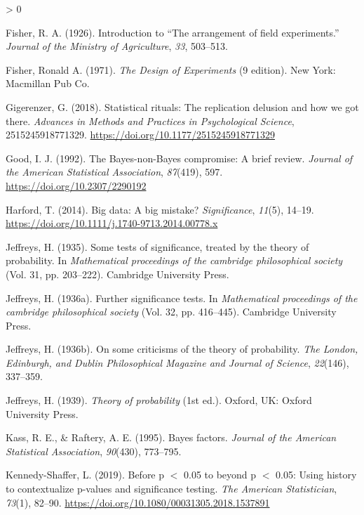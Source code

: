 \documentclass[
  english,
  ,man, a4paper,floatsintext]{apa6}
\newlength{\cslhangindent}
\newenvironment{CSLReferences}[2] %
 {%
  \setlength{\parindent}{0pt}
  \ifodd #1 \everypar{\setlength{\hangindent}{\cslhangindent}}\ignorespaces\fi
  \ifnum #2 > 0
  \setlength{\parskip}{#2\baselineskip}
  \fi
 }%
 {}
\begin{document}
\begin{CSLReferences}{1}{0}
\leavevmode\hypertarget{ref-fisher_introduction_1926}{}%
Fisher, R. A. (1926). Introduction to {``{The} arrangement of field experiments.''} \emph{Journal of the Ministry of Agriculture}, \emph{33}, 503--513.

\leavevmode\hypertarget{ref-fisher_design_1971}{}%
Fisher, Ronald A. (1971). \emph{The {Design} of {Experiments}} (9 edition). New York: Macmillan Pub Co.

\leavevmode\hypertarget{ref-gigerenzer_statistical_2018}{}%
Gigerenzer, G. (2018). Statistical rituals: The replication delusion and how we got there. \emph{Advances in Methods and Practices in Psychological Science}, 2515245918771329. \url{https://doi.org/10.1177/2515245918771329}

\leavevmode\hypertarget{ref-good_bayes-non-bayes_1992}{}%
Good, I. J. (1992). The {B}ayes-non-{B}ayes compromise: A brief review. \emph{Journal of the American Statistical Association}, \emph{87}(419), 597. \url{https://doi.org/10.2307/2290192}

\leavevmode\hypertarget{ref-harford2014big}{}%
Harford, T. (2014). Big data: A big mistake? \emph{Significance}, \emph{11}(5), 14--19. \url{https://doi.org/10.1111/j.1740-9713.2014.00778.x}

\leavevmode\hypertarget{ref-jeffreys1935some}{}%
Jeffreys, H. (1935). Some tests of significance, treated by the theory of probability. In \emph{Mathematical proceedings of the cambridge philosophical society} (Vol. 31, pp. 203--222). Cambridge University Press.

\leavevmode\hypertarget{ref-jeffreys1936further}{}%
Jeffreys, H. (1936a). Further significance tests. In \emph{Mathematical proceedings of the cambridge philosophical society} (Vol. 32, pp. 416--445). Cambridge University Press.

\leavevmode\hypertarget{ref-jeffreys1936on}{}%
Jeffreys, H. (1936b). On some criticisms of the theory of probability. \emph{The London, Edinburgh, and Dublin Philosophical Magazine and Journal of Science}, \emph{22}(146), 337--359.

\leavevmode\hypertarget{ref-Jeffreys1939}{}%
Jeffreys, H. (1939). \emph{Theory of probability} (1st ed.). Oxford, UK: Oxford University Press.

\leavevmode\hypertarget{ref-kass1995bayes}{}%
Kass, R. E., \& Raftery, A. E. (1995). Bayes factors. \emph{Journal of the American Statistical Association}, \emph{90}(430), 773--795.

\leavevmode\hypertarget{ref-kennedy-shaffer_before_2019}{}%
Kennedy-Shaffer, L. (2019). Before p {\(<\)} 0.05 to beyond p {\(<\)} 0.05: Using history to contextualize p-values and significance testing. \emph{The American Statistician}, \emph{73}(1), 82--90. \url{https://doi.org/10.1080/00031305.2018.1537891}


\end{CSLReferences}
\end{document}

